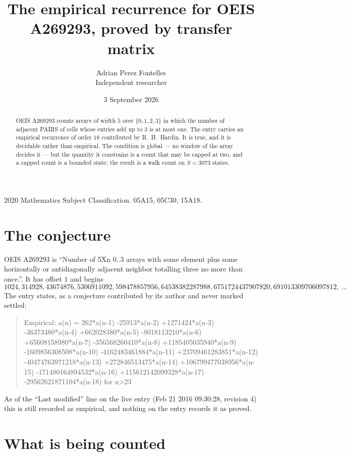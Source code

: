 \documentclass[11pt,a4paper]{article}
\title{The empirical recurrence for OEIS A269293, proved by transfer matrix}
\author{Adrian Perez Fontelles\\ \small Independent researcher}
\date{3 September 2026}
\theoremstyle{plain}
\theoremstyle{definition}
\begin{document}
\maketitle

\begin{abstract}
OEIS A269293 counts arrays of width $5$ over $\{0,1,2,3\}$ in which the number of adjacent PAIRS of
cells whose entries add up to $3$ is at most one. The entry carries an empirical recurrence of
order $18$ contributed by R.~H.~Hardin. It is true, and it is decidable rather than
empirical. The condition is global --- no window of the array decides it --- but the quantity
it constrains is a count that may be capped at two, and a capped count is a bounded state; the
result is a walk count on $S=3073$ states.
\end{abstract}

\noindent\small 2020 Mathematics Subject Classification. 05A15, 05C30, 15A18.\normalsize

\section{The conjecture}

OEIS A269293 is ``Number of 5Xn 0..3 arrays with some element plus some horizontally or antidiagonally adjacent neighbor totalling three no more than once.''. It has offset $1$ and begins
\[
1024, 314928, 43674876, 5306911092, 598478857956, 64538382287988, 6751724437907820, 691013309706097812,\ \dots
\]
The entry states, as a conjecture contributed by its author and never marked settled:
\begin{quote}
Empirical: a(n) = 262*a(n-1) -25913*a(n-2) +1271424*a(n-3) -36373480*a(n-4) +662028380*a(n-5) -8018113210*a(n-6) +65608158980*a(n-7) -356568260410*a(n-8) +1185405035940*a(n-9) -1609856308508*a(n-10) -4162483461884*a(n-11) +23709461283851*a(n-12) -40474763971218*a(n-13) +272846513475*a(n-14) +106799477038956*a(n-15) -171480164894532*a(n-16) +115612142099328*a(n-17) -29562621871104*a(n-18) for n>23
\end{quote}
As of the ``Last modified'' line on the live entry (Feb 21 2016 09:30:28, revision 4) this is still
recorded as empirical, and nothing on the entry records it as proved.

\section{What is being counted}
\end{document}

